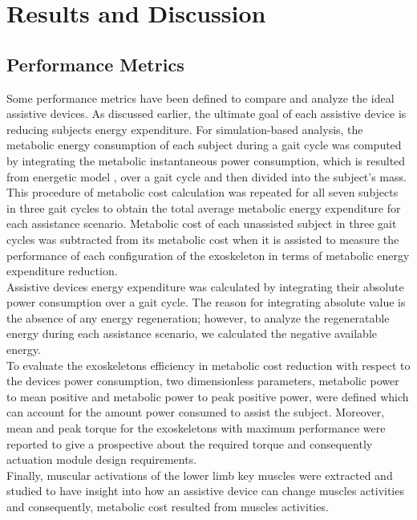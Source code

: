 \documentclass[10pt,letterpaper]{article}
\begin{document}
\section*{Results and Discussion}
\subsection*{Performance Metrics}
Some performance metrics have been defined to compare and analyze the ideal assistive devices. As discussed earlier, the ultimate goal of each assistive device is reducing subjects energy expenditure. For simulation-based analysis, the metabolic energy consumption of each subject during a gait cycle was computed by integrating the metabolic instantaneous power consumption, which is resulted from energetic model \cite{106}, over a gait cycle and then divided into the subject's mass.
This procedure of metabolic cost calculation was repeated for all seven subjects in three gait cycles to obtain the total average metabolic energy expenditure for each assistance scenario. Metabolic cost of each unassisted subject in three gait cycles was subtracted from its metabolic cost when it is assisted to measure the performance of each configuration of the exoskeleton in terms of metabolic energy expenditure reduction.\\
Assistive devices energy expenditure was calculated by integrating their absolute power consumption over a gait cycle. The reason for integrating absolute value is the absence of any energy regeneration; however, to analyze the regeneratable energy during each assistance scenario, we calculated the negative available energy.\\
To evaluate the exoskeletons efficiency in metabolic cost reduction with respect to the devices power consumption, two dimensionless parameters, metabolic power to mean positive and metabolic power to peak positive power, were defined which can account for the amount power consumed to assist the subject. Moreover, mean and peak torque for the exoskeletons with maximum performance were reported to give a prospective about the required torque and consequently actuation module design requirements.\\
Finally, muscular activations of the lower limb key muscles were extracted and studied to have insight into how an assistive device can change muscles activities and consequently, metabolic cost resulted from muscles activities.
\end{document}
